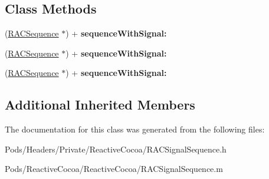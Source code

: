 \subsection*{Class Methods}
\begin{DoxyCompactItemize}
\item 
\mbox{\label{interface_r_a_c_signal_sequence_ac2c4968dbad03e1da941eb63ef45c7e4}} 
(\mbox{\hyperlink{interface_r_a_c_sequence}{R\+A\+C\+Sequence}} $\ast$) + {\bfseries sequence\+With\+Signal\+:}
\item 
\mbox{\label{interface_r_a_c_signal_sequence_ac2c4968dbad03e1da941eb63ef45c7e4}} 
(\mbox{\hyperlink{interface_r_a_c_sequence}{R\+A\+C\+Sequence}} $\ast$) + {\bfseries sequence\+With\+Signal\+:}
\item 
\mbox{\label{interface_r_a_c_signal_sequence_ac2c4968dbad03e1da941eb63ef45c7e4}} 
(\mbox{\hyperlink{interface_r_a_c_sequence}{R\+A\+C\+Sequence}} $\ast$) + {\bfseries sequence\+With\+Signal\+:}
\end{DoxyCompactItemize}
\subsection*{Additional Inherited Members}


The documentation for this class was generated from the following files\+:\begin{DoxyCompactItemize}
\item 
Pods/\+Headers/\+Private/\+Reactive\+Cocoa/R\+A\+C\+Signal\+Sequence.\+h\item 
Pods/\+Reactive\+Cocoa/\+Reactive\+Cocoa/R\+A\+C\+Signal\+Sequence.\+m\end{DoxyCompactItemize}
